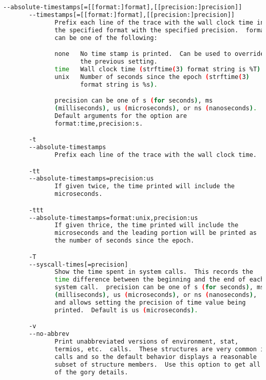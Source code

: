 {{\begin{lstlisting}[language=bash]
       --absolute-timestamps[=[[format:]format],[[precision:]precision]]
       --timestamps[=[[format:]format],[[precision:]precision]]
              Prefix each line of the trace with the wall clock time in
              the specified format with the specified precision.  format
              can be one of the following:

              none   No time stamp is printed.  Can be used to override
                     the previous setting.
              time   Wall clock time (strftime(3) format string is %T).
              unix   Number of seconds since the epoch (strftime(3)
                     format string is %s).

              precision can be one of s (for seconds), ms
              (milliseconds), us (microseconds), or ns (nanoseconds).
              Default arguments for the option are
              format:time,precision:s.

       -t
       --absolute-timestamps
              Prefix each line of the trace with the wall clock time.

       -tt
       --absolute-timestamps=precision:us
              If given twice, the time printed will include the
              microseconds.

       -ttt
       --absolute-timestamps=format:unix,precision:us
              If given thrice, the time printed will include the
              microseconds and the leading portion will be printed as
              the number of seconds since the epoch.

       -T
       --syscall-times[=precision]
              Show the time spent in system calls.  This records the
              time difference between the beginning and the end of each
              system call.  precision can be one of s (for seconds), ms
              (milliseconds), us (microseconds), or ns (nanoseconds),
              and allows setting the precision of time value being
              printed.  Default is us (microseconds).

       -v
       --no-abbrev
              Print unabbreviated versions of environment, stat,
              termios, etc.  calls.  These structures are very common in
              calls and so the default behavior displays a reasonable
              subset of structure members.  Use this option to get all
              of the gory details.


\end{lstlisting}}}
